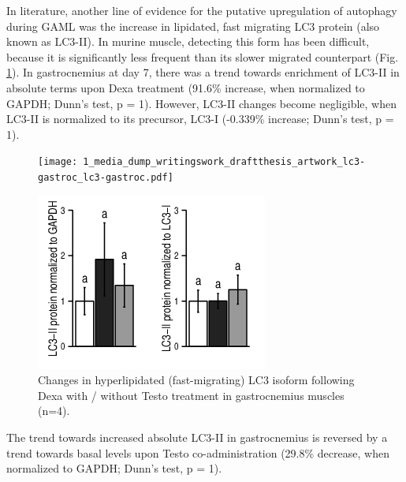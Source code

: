 \documentclass[12pt,english]{report}\usepackage[]{graphicx}\usepackage[]{color}
\newenvironment{knitrout}{}{} %
\begin{document}
In literature, another line of evidence for the putative upregulation
of autophagy during GAML was the increase in lipidated, fast migrating
LC3 protein (also known as LC3-II). In murine muscle, detecting this
form has been difficult, because it is significantly less frequent
than its slower migrated counterpart (Fig. \ref{fig:LC3-hyperlipidated}).
In gastrocnemius at day 7, there was a trend towards enrichment of
LC3-II in absolute terms upon Dexa treatment (91.6\%
increase, when normalized to GAPDH; Dunn's test, p = 1).
However, LC3-II changes become negligible, when LC3-II is normalized
to its precursor, LC3-I (-0.339\%
increase; Dunn's test, p = 1).

\begin{figure}
\begin{minipage}[t][2in][c]{3in}%
\texttt{[image: 1\_media\_dump\_writingswork\_draftthesis\_artwork\_lc3-gastroc\_lc3-gastroc.pdf]}%
\end{minipage}%
\begin{minipage}[t][2.2in][c]{3in}%
\begin{knitrout}
\color{fgcolor}
\includegraphics[width=3in,height=2.in]{figure/lcprotein-1} 

\end{knitrout}
%
\end{minipage}

\protect\caption[Changes in LC3 lipidation status following Dexa with / without Testo
treatments.]{Changes in hyperlipidated (fast-migrating) LC3 isoform following
Dexa with / without Testo treatment in gastrocnemius muscles (n=4)\label{fig:LC3-hyperlipidated}.}
\end{figure}


The trend towards increased absolute LC3-II in gastrocnemius is reversed
by a trend towards basal levels upon Testo co-administration (29.8\%
decrease, when normalized to GAPDH; Dunn's test, p = 1).
\end{document}
